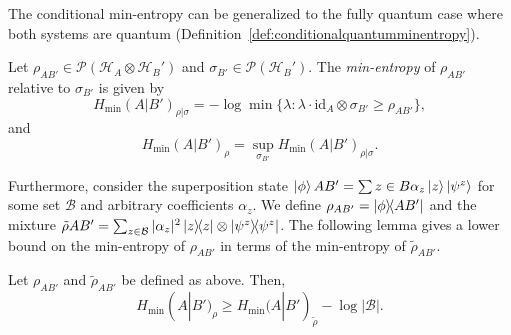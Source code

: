 
The conditional min-entropy can be generalized to the fully quantum case where both systems are quantum (Definition~\ref{def:conditionalquantumminentropy}).

\begin{definition}
\label{def:conditionalquantumminentropy}
Let $\rho_{A B'} \in \mathcal{P}(\mathcal{H}_A \otimes \mathcal{H}_B')$ and $\sigma_{B'} \in \mathcal{P}(\mathcal{H}_B')$. The \textit{min-entropy} of $\rho_{A B'}$ relative to $\sigma_{B'}$ is given by
$$H_{\text{min}}(A | B')_{\rho|\sigma} = -\log \min\{ \lambda : \lambda \cdot \text{id}_A \otimes \sigma_{B'} \geq \rho_{A B'} \},$$
and 
$$ H_{\text{min}}(A | B')_{\rho} = \sup_{\sigma_{B'}} H_{\text{min}}(A | B')_{\rho|\sigma}.$$
\end{definition}

Furthermore, consider the superposition state $\ket{\phi}{AB'} = \sum{z\in B}\alpha_z\ket{z} \ket{\psi^z}$ for some set $\mathcal{B}$ and arbitrary coefficients $\alpha_z$. We define $\rho_{AB'} = \ketbra{\phi}{AB'}$ and the mixture $\tilde{\rho}{AB'} = \sum_{z\in \mathcal{B}} |\alpha_z|^2 \ketbra{z} \otimes \ketbra{\psi^z}$. The following lemma gives a lower bound on the min-entropy of $\rho_{AB'}$ in terms of the min-entropy of $\tilde{\rho}_{AB'} $.


\begin{lemma}
Let $\rho_{AB'}$ and $\tilde{\rho}_{AB'}$ be defined as above. Then,
$$H_{\text{min}}(A | B')_{\rho} \geq H_{\text{min}}(A | B')_{\tilde{\rho}} - \log |\mathcal{B}|.$$
\label{lemma:renner_lower_bound}
\end{lemma}

